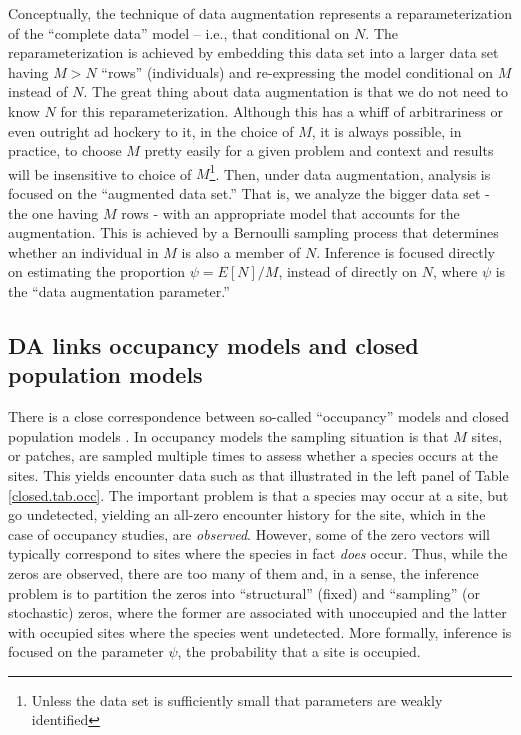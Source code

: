 Conceptually, the technique of data augmentation represents a
reparameterization of the ``complete data'' model -- i.e., that
conditional on $N$. The reparameterization is achieved by embedding
this data set into a larger data set having $M> N$ ``rows''
(individuals) and re-expressing the model conditional on $M$ instead
of $N$. The great thing about data augmentation is that we do not need
to know $N$ for this reparameterization.  Although this has a whiff of
arbitrariness or even outright ad hockery to it, in the choice of $M$,
it is always possible, in practice, to choose $M$ pretty easily for a
given problem and context and results will be insensitive to choice of
$M$\footnote{Unless the data set is sufficiently small that parameters
  are weakly identified}.  Then, under data augmentation, analysis is
focused on the ``augmented data set.'' That is, we analyze the bigger
data set - the one having $M$ rows - with an appropriate model that
accounts for the augmentation. This is achieved by a Bernoulli
sampling process that determines whether an individual in $M$ is also
a member of $N$.  Inference is focused directly on estimating the
proportion $\psi = E[N]/M$, instead of directly on $N$, where $\psi$
is the ``data augmentation parameter.''


\subsection{DA links occupancy models and closed population models}


There is a close correspondence between so-called ``occupancy'' models and closed
population models \citet[see][sec. 5.6]{royle_dorazio:2008}.
In occupancy models \citep{mackenzie_etal:2002, tyre_etal:2003} the
sampling situation is that $M$ sites, or patches, are sampled multiple
times to assess whether a species occurs at the sites.  This yields
encounter data such as that illustrated in the left panel of Table
\ref{closed.tab.occ}. The important problem is that a species may
occur at a site, but go undetected, yielding an all-zero encounter
history for the site, which in the case of occupancy studies, are {\it
  observed}. However, some of the zero vectors will typically correspond
to sites where the species in fact {\it does} occur. Thus, while the
zeros are observed, there are too many of them and, in a sense, the
inference problem is to partition the zeros into ``structural''
(fixed) and ``sampling'' (or stochastic) zeros, where the former are
associated with unoccupied and the latter with occupied sites where
the species went undetected. More
formally, inference is focused on the parameter $\psi$, the
probability that a site is occupied.

